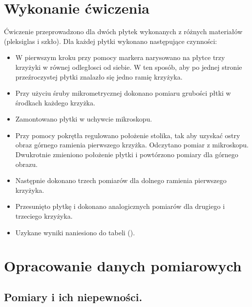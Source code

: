 \documentclass [a4paper,11pt]{article}
\begin{document}
	\section{Wykonanie ćwiczenia}
	Ćwiczenie przeprowadzono dla dwóch płytek wykonanych z różnych materiałów (pleksiglas i szkło).
	Dla każdej płytki wykonano następujące czynności:
	\begin{itemize}
		\item W pierwszym kroku przy pomocy markera narysowano na płytce trzy krzyżyki w równej odległosci od siebie.
		W ten sposób, aby po jednej stronie przeźroczystej płytki znalazło się jedno ramię krzyżyka.
		\item 
			Przy użyciu śruby mikrometrycznej dokonano pomiaru grubości płtki w 
			środkach każdego krzyżka.
		\item Zamontowano płytki w uchywcie mikroskopu. 
		\item Przy pomocy pokrętła regulowano położenie stolika, tak aby uzyskać ostry obraz 
		górnego ramienia pierwszego krzyżka.  Odczytano pomiar z mikroskopu. Dwukrotnie zmieniono położenie płytki i powtórzono pomiary dla górnego obrazu.
		\item Następnie dokonano trzech pomiarów dla dolnego ramienia pierwszego krzyżyka.
		\item Przesunięto płytkę i dokonano analogicznych pomiarów dla drugiego i trzeciego krzyżyka.
		\item Uzykane wyniki naniesiono do tabeli ().  
	\end{itemize}
	

	\section{Opracowanie danych pomiarowych}\label{sec:opr}
	\subsection{Pomiary i ich niepewności.}
		
	
 
	
\end{document}
